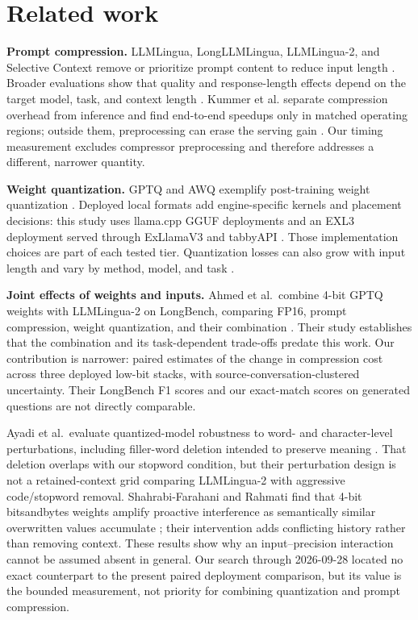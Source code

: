 \documentclass[11pt]{article}
\begin{document}
\section{Related work}\label{sec:related}

\textbf{Prompt compression.} LLMLingua, LongLLMLingua, LLMLingua-2, and
Selective Context remove or prioritize prompt content to reduce input length
\citep{jiang2023llmlingua,jiang2024longllmlingua,pan2024llmlingua2,li2023selective}.
Broader evaluations show that quality and response-length effects depend on
the target model, task, and context length \citep{zhang2025empirical}. Kummer
et al. separate compression overhead from inference and find end-to-end
speedups only in matched operating regions; outside them, preprocessing can
erase the serving gain \citep{kummer2026wild}. Our timing measurement excludes
compressor preprocessing and therefore addresses a different, narrower
quantity.

\textbf{Weight quantization.} GPTQ and AWQ exemplify post-training weight
quantization \citep{frantar2023gptq,lin2024awq}. Deployed local formats add
engine-specific kernels and placement decisions: this study uses llama.cpp
GGUF deployments \citep{llamacpp} and an EXL3 deployment served through
ExLlamaV3 and tabbyAPI \citep{exllamav3,tabbyapi}. Those implementation choices
are part of each tested tier. Quantization losses can also grow with input
length and vary by method, model, and task \citep{mekala2025quantization}.

\textbf{Joint effects of weights and inputs.} Ahmed et al.\ combine 4-bit
GPTQ weights with LLMLingua-2 on LongBench, comparing FP16, prompt compression,
weight quantization, and their combination \citep{ahmed2025systematic}.
Their study establishes that the combination and its task-dependent trade-offs
predate this work. Our contribution is narrower: paired estimates of the
change in compression cost across three deployed low-bit stacks, with
source-conversation-clustered uncertainty. Their LongBench F1 scores and our
exact-match scores on generated questions are not directly comparable.

Ayadi et al.\ evaluate quantized-model robustness to word- and character-level
perturbations, including filler-word deletion intended to preserve meaning
\citep{ayadi2026reliability}. That deletion overlaps with our stopword
condition, but their perturbation design is not a retained-context grid
comparing LLMLingua-2 with aggressive code/stopword removal. Shahrabi-Farahani
and Rahmati find that 4-bit bitsandbytes weights amplify proactive interference
as semantically similar overwritten values accumulate
\citep{shahrabifarahani2026compress}; their intervention adds conflicting
history rather than removing context. These results show why an input--precision
interaction cannot be assumed absent in general. Our search through
2026-09-28 located no exact counterpart to the present paired deployment
comparison, but its value is the bounded measurement, not priority for combining
quantization and prompt compression.
\end{document}
